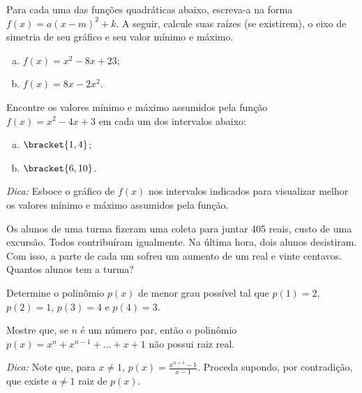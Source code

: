 \begin{exercise}
    Para cada uma das funções quadráticas abaixo, escreva-a na forma
$f(x)=a(x-m)^2+k$. A seguir, calcule suas raízes (se existirem), o
eixo de simetria de seu gráfico e seu valor mínimo e máximo.
%
\begin{enumerate}[(a)]
  \item $f(x) = x^2 -8x +23$;
  \item $f(x) = 8x - 2x^2$.
\end{enumerate}
\end{exercise}

\begin{exercise}
    Encontre os valores mínimo e máximo assumidos pela função $f(x)
= x^2 -4x +3$ em cada um dos intervalos abaixo:
\begin{enumerate}[(a)]
  \item $\bracket{1, 4}$;
  \item $\bracket{6, 10}$.
\end{enumerate}
\emph{Dica:} Esboce o gráfico de $f(x)$ nos intervalos indicados
para visualizar melhor os valores mínimo e máximo assumidos pela
função.
\end{exercise}

\begin{exercise}
    Os alunos de uma turma fizeram uma coleta para juntar 405 reais,
custo de uma excursão. Todos contribuíram igualmente. Na última
hora, dois alunos desistiram. Com isso, a parte de cada um sofreu um
aumento de um real e vinte centavos. Quantos alunos tem a turma?
\end{exercise}

\begin{exercise}
    Determine o polinômio $p(x)$ de menor grau possível tal que
$p(1) = 2$, $p(2)=1$, $p(3) = 4$ e $p(4) = 3$.
\end{exercise}

\begin{exercise}
Mostre que, se $n$ é um número par, então o polinômio $p(x) =
x^n + x^{n-1} + \dots + x+1$ não possui raiz real.

\noindent \emph{Dica: } Note que, para $x \neq 1$, $p(x) =
\frac{x^{n+1}-1}{x-1}$. Proceda supondo, por contradição, que existe
$a \neq 1$ raiz de $p(x)$.
\end{exercise}